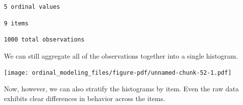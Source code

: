 \documentclass[
  letterpaper,
  DIV=11,
  numbers=noendperiod]{scrartcl}
\newenvironment{Shaded}{\begin{snugshade}}{\end{snugshade}}
\newcommand{\AttributeTok}[1]{\textcolor[rgb]{0.40,0.45,0.13}{#1}}
\newcommand{\DecValTok}[1]{\textcolor[rgb]{0.68,0.00,0.00}{#1}}
\newcommand{\FloatTok}[1]{\textcolor[rgb]{0.68,0.00,0.00}{#1}}
\newcommand{\FunctionTok}[1]{\textcolor[rgb]{0.28,0.35,0.67}{#1}}
\newcommand{\NormalTok}[1]{\textcolor[rgb]{0.00,0.23,0.31}{#1}}
\newcommand{\SpecialCharTok}[1]{\textcolor[rgb]{0.37,0.37,0.37}{#1}}
\newcommand{\StringTok}[1]{\textcolor[rgb]{0.13,0.47,0.30}{#1}}
\begin{document}
\begin{verbatim}
5 ordinal values
\end{verbatim}

\begin{Shaded}
\end{Shaded}

\begin{verbatim}
9 items
\end{verbatim}

\begin{Shaded}
\end{Shaded}

\begin{verbatim}
1000 total observations
\end{verbatim}

We can still aggregate all of the observations together into a single
histogram.

\begin{Shaded}
\end{Shaded}

\texttt{[image: ordinal\_modeling\_files/figure-pdf/unnamed-chunk-52-1.pdf]}

Now, however, we can also stratify the histograms by item. Even the raw
data exhibits clear differences in behavior across the items.
\end{document}
